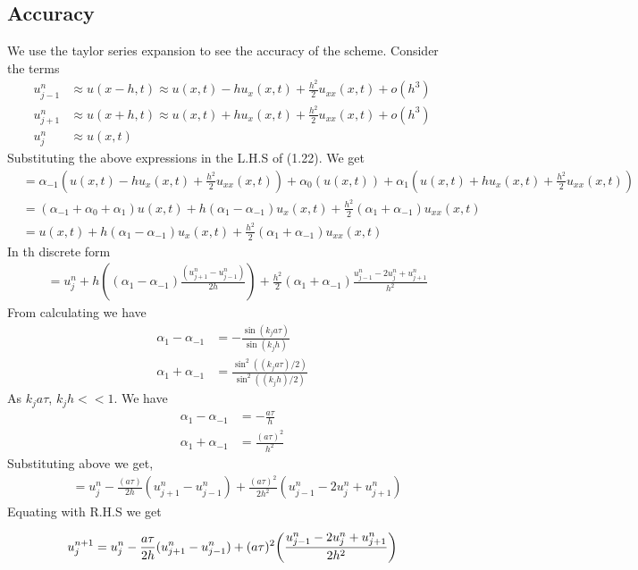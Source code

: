 \subsection{Accuracy}
We use the taylor series expansion to see the accuracy of the scheme.
Consider the terms
\begin{align*}
 u_{j-1}^{n} &\approx u(x-h,t) \approx u(x,t)-hu_{x}(x,t) + \frac{h^2}{2}u_{xx}(x,t)+o(h^3)\\
 u_{j+1}^{n} &\approx u(x+h,t) \approx u(x,t)+hu_{x}(x,t) + \frac{h^2}{2}u_{xx}(x,t)+o(h^3)\\
 u_{j}^{n} &\approx u(x,t)
\end{align*}
Substituting the above expressions in the  L.H.S of (1.22). We get
\begin{align*}
 &=\alpha_{-1}(u(x,t)-hu_{x}(x,t) + \frac{h^2}{2}u_{xx}(x,t))+\alpha_{0}(u(x,t)) + \alpha_{1}( u(x,t)+hu_{x}(x,t) + \frac{h^2}{2}u_{xx}(x,t))\\
 &=(\alpha_{-1}+\alpha_{0}+\alpha_{1})u(x,t) + h(\alpha_{1}-\alpha_{-1})u_{x}(x,t)+\frac{h^2}{2}(\alpha_{1}+\alpha_{-1})u_{xx}(x,t)\\
 &=u(x,t)+h(\alpha_{1}-\alpha_{-1})u_{x}(x,t)+\frac{h^2}{2}(\alpha_{1}+\alpha_{-1})u_{xx}(x,t)
\end{align*}
In th discrete form
\begin{align*}
 &=u_{j}^{n}+h((\alpha_{1}-\alpha_{-1})\frac{(u_{j+1}^{n}-u_{j-1}^{n})}{2h})+\frac{h^2}{2}(\alpha_{1}+\alpha_{-1})\frac{u_{j-1}^{n}-2u_{j}^{n}+u_{j+1}^{n}}{h^2}
\end{align*}
From calculating we have
\begin{align*}
 \alpha_{1}-\alpha_{-1}&= -\frac{\sin(k_{j}a\tau)}{\sin(k_{j} h)}\\
 \alpha_{1}+\alpha_{-1}&= \frac{\sin^2((k_{j}a\tau)/2)}{\sin^2((k_{j} h)/2)}
\end{align*}
As $k_j a\tau $,\hspace{2mm} $k_{j}h <<1$. We have
\begin{align*}
 \alpha_{1}-\alpha_{-1}&= -\frac{a\tau}{h}\\
 \alpha_{1}+\alpha_{-1}&= \frac{(a\tau)^2}{h^2}
\end{align*}
Substituting above we get,
\begin{align*}
 &=u_{j}^{n}-\frac{(a\tau)}{2h} (u_{j+1}^{n}-u_{j-1}^{n})+\frac{(a\tau)^2}{2h^2} (u_{j-1}^{n}-2u_{j}^{n}+u_{j+1}^{n})
\end{align*}
Equating with R.H.S we get

\begin{align*}
 u_{j}^{n+1} = u_{j}^{n} - \frac{a \tau}{2h} (u_{j+1}^{n}-u_{j-1}^{n}) + (a \tau)^2\bigg{(}\frac{u_{j-1}^{n}-2u_{j}^{n}+u_{j+1}^{n}}{2h^2}\bigg{)}
\end{align*}

